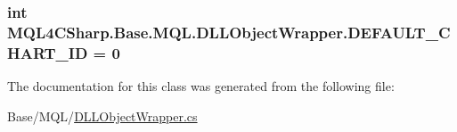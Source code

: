 \subsubsection[{\texorpdfstring{D\+E\+F\+A\+U\+L\+T\+\_\+\+C\+H\+A\+R\+T\+\_\+\+ID}{DEFAULT_CHART_ID}}]{\setlength{\rightskip}{0pt plus 5cm}int M\+Q\+L4\+C\+Sharp.\+Base.\+M\+Q\+L.\+D\+L\+L\+Object\+Wrapper.\+D\+E\+F\+A\+U\+L\+T\+\_\+\+C\+H\+A\+R\+T\+\_\+\+ID = 0\hspace{0.3cm}{\ttfamily [static]}}\hypertarget{class_m_q_l4_c_sharp_1_1_base_1_1_m_q_l_1_1_d_l_l_object_wrapper_a8326e544edd70aca0fa5f0f597505711}{}\label{class_m_q_l4_c_sharp_1_1_base_1_1_m_q_l_1_1_d_l_l_object_wrapper_a8326e544edd70aca0fa5f0f597505711}


The documentation for this class was generated from the following file\+:\begin{DoxyCompactItemize}
\item 
Base/\+M\+Q\+L/\hyperlink{_d_l_l_object_wrapper_8cs}{D\+L\+L\+Object\+Wrapper.\+cs}\end{DoxyCompactItemize}
